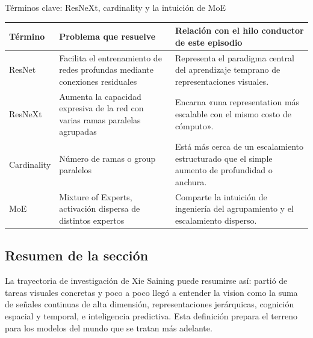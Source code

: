 \begin{knowledgebox}{Términos clave: ResNeXt, cardinality y la intuición de MoE}
\begin{tabularx}{\textwidth}{p{}p{}X}
\toprule
Término & Problema que resuelve & Relación con el hilo conductor de este episodio \\
\midrule
ResNet & Facilita el entrenamiento de redes profundas mediante conexiones residuales & Representa el paradigma central del aprendizaje temprano de representaciones visuales. \\
ResNeXt & Aumenta la capacidad expresiva de la red con varias ramas paralelas agrupadas & Encarna «una representation más escalable con el mismo costo de cómputo». \\
Cardinality & Número de ramas o group paralelos & Está más cerca de un escalamiento estructurado que el simple aumento de profundidad o anchura. \\
MoE & Mixture of Experts, activación dispersa de distintos expertos & Comparte la intuición de ingeniería del agrupamiento y el escalamiento disperso. \\
\bottomrule
\end{tabularx}
\end{knowledgebox}

\subsection{Resumen de la sección}

La trayectoria de investigación de Xie Saining puede resumirse así: partió de tareas visuales concretas y poco a poco llegó a entender la vision como la suma de señales continuas de alta dimensión, representaciones jerárquicas, cognición espacial y temporal, e inteligencia predictiva. Esta definición prepara el terreno para los modelos del mundo que se tratan más adelante.

